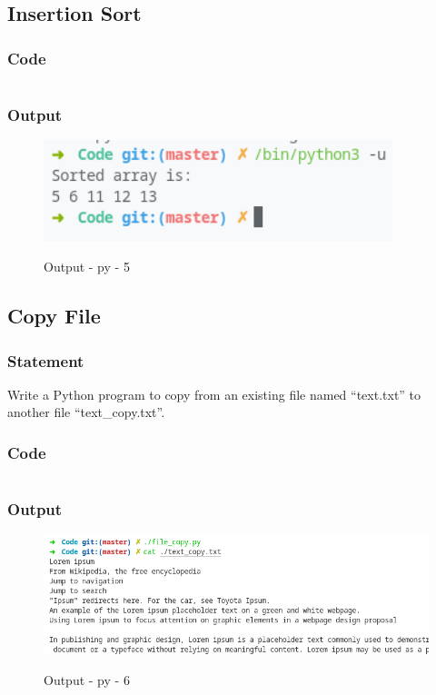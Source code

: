 \subsection{Insertion Sort}

\subsubsection{Code}

\inputminted[]{python}{../Code/insertion_sort.py}

\subsubsection{Output}
\begin{figure}[!htb]
  \centering
  \includegraphics[width=4in]{Images/insertion.png}
  \label{output:py-5}
  \caption{Output - py - 5}
\end{figure}
\pagebreak

\subsection{Copy File}

\subsubsection{Statement}
Write a Python program to copy from an existing file named “text.txt” to another file “text\_copy.txt”.

\subsubsection{Code}

\inputminted[]{python}{../Code/file_copy.py}

\subsubsection{Output}
\begin{figure}[!htb]
  \centering
  \includegraphics[width=5in]{Images/file_copy.png}
  \label{output:py-6}
  \caption{Output - py - 6}
\end{figure}
\pagebreak

